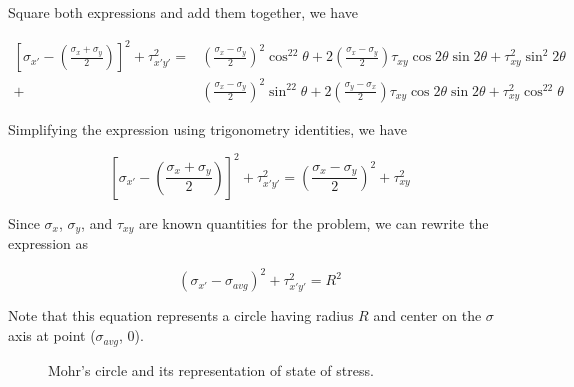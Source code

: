 \documentclass[
10pt,
a4paper,
openany,
svgnames,
]{book} %
\begin{document}
Square both expressions and add them together, we have

\begin{align*}
  \left[ \sigma_{x'} - \left( \frac{\sigma_x + \sigma_y}{2} \right) \right]^2 + \tau_{x'y'}^2 = &\left( \frac{\sigma_x - \sigma_y}{2} \right)^2\cos^22\theta  + 2\left( \frac{\sigma_x - \sigma_y}{2} \right)\tau_{xy}\cos 2\theta \sin 2\theta  + \tau_{xy}^2{\sin^2}2\theta \\
  + &\left( \frac{\sigma_x - \sigma_y}{2} \right)^2\sin^22\theta  + 2\left( \frac{\sigma_y - \sigma_x}{2} \right)\tau_{xy}\cos 2\theta \sin 2\theta  + \tau_{xy}^2\cos^22\theta
\end{align*}

Simplifying the expression using trigonometry identities, we have

\[\left[ \sigma_{x'} - \left( \frac{\sigma_x + \sigma_y}{2} \right) \right]^2 + \tau_{x'y'}^2 = \left( \frac{\sigma_x - \sigma_y}{2} \right)^2 + \tau _{xy}^2\]

Since $\sigma_x$, $\sigma_y$, and $\tau_{xy}$ are known quantities for the problem, we can rewrite the expression as

\begin{equation}
  (\sigma_{x'} - \sigma_{avg})^2 + \tau_{x'y'}^2 = R^2
\end{equation}

Note that this equation represents a circle having radius $R$ and center on the $\sigma$ axis at point ($\sigma_{avg}$, 0).

\begin{figure}[h]
  \centering
  \caption{Mohr's circle and its representation of state of stress.}
  \label{fig: mohr's circle}
\end{figure}
\end{document}
